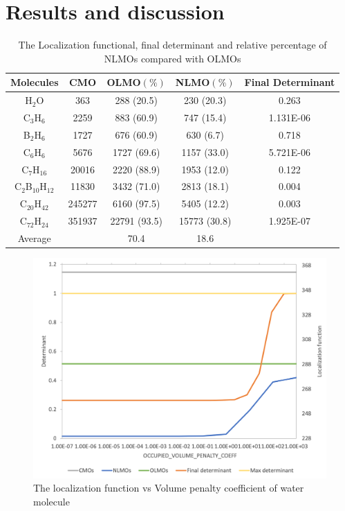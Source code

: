 \documentclass[aps,prl,reprint,amsmath,amssymb]{revtex4-1}
\begin{document}
\section{Results and discussion}


\begin{table}[ht]
\caption{The Localization functional, final determinant and relative percentage of NLMOs compared with OLMOs}
\centering
\begin{tabular}{c c c c c}
\hline\hline
Molecules & CMO &  OLMO$(\%)$ & NLMO$(\%)$ & Final Determinant \\
\hline
H$_2$O& 363 & 288 (20.5) & 230 (20.3) & 0.263 \\ 
C$_3$H$_6$ & 2259 & 883 (60.9) & 747 (15.4) & 1.131E-06 \\ 
B$_2$H$_6$ & 1727 & 676 (60.9) & 630 (6.7) & 0.718 \\ 
C$_6$H$_6$  & 5676 & 1727 (69.6) & 1157 (33.0) & 5.721E-06 \\ 
C$_7$H$_{16}$ & 20016 & 2220 (88.9) & 1953 (12.0) & 0.122 \\ 
C$_2$B$_{10}$H$_{12}$ & 11830 & 3432 (71.0) & 2813 (18.1) & 0.004 \\ 
C$_{20}$H$_{42}$ & 245277 & 6160 (97.5) & 5405 (12.2) & 0.003 \\ 
C$_{72}$H$_{24}$ & 351937 & 22791 (93.5) & 15773 (30.8) & 1.925E-07 \\ 
Average & & 70.4 & 18.6 & \\
\hline
\end{tabular}
\label{table:nonlin}
\end{table}

\begin{figure}[htbp]
\includegraphics[scale=0.5]{water.png} 
  \caption{The localization function vs Volume penalty coefficient of water molecule}
\end{figure}
\end{document}

